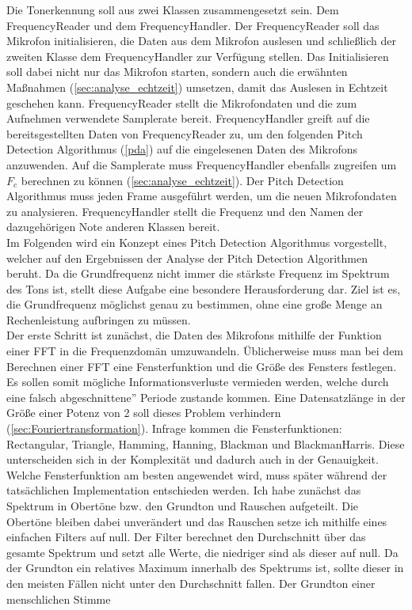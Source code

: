 Die Tonerkennung soll aus zwei Klassen zusammengesetzt sein. Dem FrequencyReader und dem FrequencyHandler. Der FrequencyReader soll das Mikrofon initialisieren, die Daten aus dem Mikrofon auslesen und schließlich der zweiten Klasse dem FrequencyHandler zur Verfügung stellen. Das Initialisieren soll dabei nicht nur das Mikrofon starten, sondern auch die erwähnten Maßnahmen (\ref{sec:analyse_echtzeit}) umsetzen, damit das Auslesen in Echtzeit geschehen kann. FrequencyReader stellt die Mikrofondaten und die zum Aufnehmen verwendete Samplerate bereit. FrequencyHandler greift auf die bereitsgestellten Daten von FrequencyReader zu, um den folgenden Pitch Detection Algorithmus (\ref{pda}) auf die eingelesenen Daten des Mikrofons anzuwenden. Auf die Samplerate muss FrequencyHandler ebenfalls zugreifen um $F_c$ berechnen zu können (\ref{sec:analyse_echtzeit}). Der Pitch Detection Algorithmus muss jeden Frame ausgeführt werden, um die neuen Mikrofondaten zu analysieren. FrequencyHandler stellt die Frequenz und den Namen der dazugehörigen Note anderen Klassen bereit.\\
Im Folgenden wird ein Konzept eines Pitch Detection Algorithmus vorgestellt, welcher auf den Ergebnissen der Analyse der Pitch Detection Algorithmen beruht. Da die Grundfrequenz nicht immer die stärkste Frequenz im Spektrum des Tons ist, stellt diese Aufgabe eine besondere Herausforderung dar. Ziel ist es, die Grundfrequenz möglichst genau zu bestimmen, ohne eine große Menge an Rechenleistung aufbringen zu müssen. \\
Der erste Schritt ist zunächst, die Daten des Mikrofons mithilfe der Funktion einer FFT in die Frequenzdomän umzuwandeln. Üblicherweise muss man bei dem Berechnen einer FFT eine Fensterfunktion und die Größe des Fensters festlegen. Es sollen somit mögliche Informationsverluste vermieden werden, welche durch eine falsch \glqq abgeschnittene'' Periode zustande kommen. Eine Datensatzlänge in der Größe einer Potenz von 2 soll dieses Problem verhindern (\ref{sec:Fouriertransformation}). Infrage kommen die Fensterfunktionen: Rectangular, Triangle, Hamming, Hanning, Blackman und BlackmanHarris. Diese unterscheiden sich in der Komplexität und dadurch auch in der Genauigkeit. Welche Fensterfunktion am besten angewendet wird, muss später während der tatsächlichen Implementation entschieden werden.
Ich habe zunächst das Spektrum in Obertöne bzw. den Grundton und Rauschen aufgeteilt. Die Obertöne bleiben dabei unverändert und das Rauschen setze ich mithilfe eines einfachen Filters auf null. Der Filter berechnet den Durchschnitt über das gesamte Spektrum und setzt alle Werte, die niedriger sind als dieser auf null. Da der Grundton ein relatives Maximum innerhalb des Spektrums ist, sollte dieser in den meisten Fällen nicht unter den Durchschnitt fallen. Der Grundton einer menschlichen Stimme 
